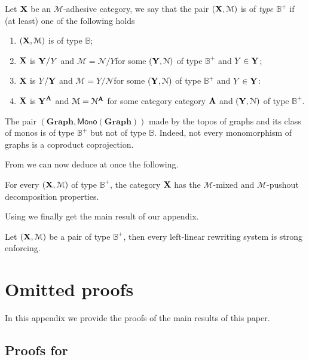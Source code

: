 \documentclass[a4paper,UKenglish,cleveref,pdftex,thm-restate,numberwithinsect]{lipics-v2021}
\newcommand{\mon}{\mathsf{Mono}}
\def\A{\textbf {\textup{A}}}
\def\X{\textbf {\textup{X}}}
\def\Y{\textbf {\textup{Y}}}
\begin{document}
\begin{definition} Let $\X$ be an $\mathcal{M}$-adhesive category, we say that the pair $(\X, \mathcal{M})$ is of \emph{type $\mathbb{B}^+$} if (at least) one of the following holds
	\begin{enumerate}
		\item $(\X, \mathcal{M})$ is of type $\mathbb{B}$;
	\item $\X$ is $\Y/Y$ and $\mathcal{M}=\mathcal{N}/Y$for some $(\Y, \mathcal{N})$ of type $\mathbb{B}^+$ and $Y\in \Y$;
 	\item $\X$ is $Y/\Y$ and $\mathcal{M}=Y/\mathcal{N}$for some $(\Y, \mathcal{N})$ of type $\mathbb{B}^+$ and $Y\in \Y$:
 	\item $\X$ is $\Y^{\A}$ and $\mathcal{M}=\mathcal{N}^{\A}$ for some category category $\A$ and $(\Y, \mathcal{N})$ of type $\mathbb{B}^+$.
	\end{enumerate}
\end{definition}
\begin{example}
  \label{ex:graph-type-bb}
	The pair $(\mathbf{Graph}, \mon(\mathbf{Graph}))$ made by the topos of graphs and its class of monos is of type $\mathbb{B}^+$  but not of type $\mathbb{B}$. Indeed, not every monomorphism of graphs is a coproduct coprojection.
\end{example}

From  we can now deduce at once the following.
\begin{corollary}
	For every $(\X, \mathcal{M})$ of type $\mathbb{B}^+$, the category $\X$ has the $\mathcal{M}$-mixed and $\mathcal{M}$-pushout decomposition properties.
\end{corollary}

Using  we finally get the main result of our appendix.
\begin{corollary}
  \label{cor:llr-is-strEnf}
Let $(\X, \mathcal{M})$ be a pair of type $\mathbb{B}^+$, then every left-linear rewriting system is strong enforcing.
\end{corollary}



\section{Omitted proofs}\label{omitted}
In this appendix we provide the proofs of the main results of this paper. 

\subsection{Proofs for }
\end{document}
